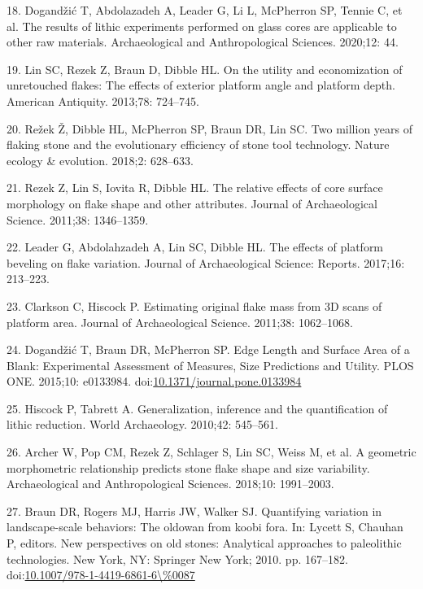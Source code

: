 \documentclass[10pt,letterpaper]{article}
\begin{document}
\leavevmode\hypertarget{ref-dogandzic_results_2020}{}%
18. Dogandžić T, Abdolazadeh A, Leader G, Li L, McPherron SP, Tennie C,
et al. The results of lithic experiments performed on glass cores are
applicable to other raw materials. Archaeological and Anthropological
Sciences. 2020;12: 44.

\leavevmode\hypertarget{ref-lin_utility_2013-1}{}%
19. Lin SC, Rezek Z, Braun D, Dibble HL. On the utility and
economization of unretouched flakes: The effects of exterior platform
angle and platform depth. American Antiquity. 2013;78: 724--745.

\leavevmode\hypertarget{ref-rezek_two_2018-1}{}%
20. Režek Ž, Dibble HL, McPherron SP, Braun DR, Lin SC. Two million
years of flaking stone and the evolutionary efficiency of stone tool
technology. Nature ecology \& evolution. 2018;2: 628--633.

\leavevmode\hypertarget{ref-rezek_relative_2011-1}{}%
21. Rezek Z, Lin S, Iovita R, Dibble HL. The relative effects of core
surface morphology on flake shape and other attributes. Journal of
Archaeological Science. 2011;38: 1346--1359.

\leavevmode\hypertarget{ref-leader_effects_2017}{}%
22. Leader G, Abdolahzadeh A, Lin SC, Dibble HL. The effects of platform
beveling on flake variation. Journal of Archaeological Science: Reports.
2017;16: 213--223.

\leavevmode\hypertarget{ref-clarkson_estimating_2011-1}{}%
23. Clarkson C, Hiscock P. Estimating original flake mass from 3D scans
of platform area. Journal of Archaeological Science. 2011;38:
1062--1068.

\leavevmode\hypertarget{ref-dogandzic_edge_2015}{}%
24. Dogandžić T, Braun DR, McPherron SP. Edge Length and Surface Area of
a Blank: Experimental Assessment of Measures, Size Predictions and
Utility. PLOS ONE. 2015;10: e0133984.
doi:\href{https://doi.org/10.1371/journal.pone.0133984}{10.1371/journal.pone.0133984}

\leavevmode\hypertarget{ref-hiscock_generalization_2010}{}%
25. Hiscock P, Tabrett A. Generalization, inference and the
quantification of lithic reduction. World Archaeology. 2010;42:
545--561.

\leavevmode\hypertarget{ref-archer_geometric_2018}{}%
26. Archer W, Pop CM, Rezek Z, Schlager S, Lin SC, Weiss M, et al. A
geometric morphometric relationship predicts stone flake shape and size
variability. Archaeological and Anthropological Sciences. 2018;10:
1991--2003.

\leavevmode\hypertarget{ref-Braun2010}{}%
27. Braun DR, Rogers MJ, Harris JW, Walker SJ. Quantifying variation in
landscape-scale behaviors: The oldowan from koobi fora. In: Lycett S,
Chauhan P, editors. New perspectives on old stones: Analytical
approaches to paleolithic technologies. New York, NY: Springer New York;
2010. pp. 167--182.
doi:\href{https://doi.org/10.1007/978-1-4419-6861-6/\%0087}{10.1007/978-1-4419-6861-6\textbackslash\%0087}
\end{document}
